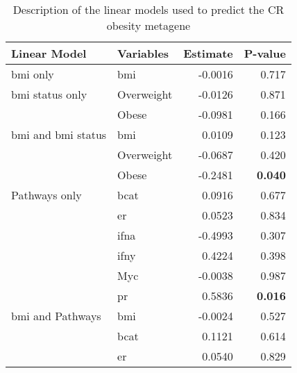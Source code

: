 \begin{table}[htpb]
	\centering
	\caption{Description of the linear models used to predict the CR obesity metagene}
	\label{tab:lm_sig_var}
	\begin{threeparttable}
		\begin{tabular}{llrr}
			Linear Model & Variables & Estimate & P-value\\
			\hline
			\hline
			\rule{0pt}{2.25ex}\gls{bmi} only                           & \gls{bmi}  & -0.0016 & 0.717\\
			\hline
			\rule{0pt}{2.25ex}\gls{bmi} status only                    & Overweight & -0.0126 & 0.871\\
                                                                       & Obese      & -0.0981 & 0.166\\
			\hline
			\rule{0pt}{2.25ex}\gls{bmi} and \gls{bmi} status           & \gls{bmi}  & 0.0109  & 0.123\\
                                                                       & Overweight & -0.0687 & 0.420\\
                                                                       & Obese      & -0.2481 & \textbf{0.040}\tnote{1}\\
			\hline
			\rule{0pt}{2.25ex}Pathways only                            & \gls{bcat} & 0.0916  & 0.677\\
                                                                       & \gls{er}   & 0.0523  & 0.834\\
                                                                       & \gls{ifna} & -0.4993 & 0.307\\
                                                                       & \gls{ifny} & 0.4224  & 0.398\\
                                                                       & Myc        & -0.0038 & 0.987\\
                                                                       & \gls{pr}   & 0.5836  & \textbf{0.016}\\
			\hline
			\rule{0pt}{2.25ex}\gls{bmi} and Pathways                   & \gls{bmi}  & -0.0024 & 0.527\\
                                                                       & \gls{bcat} & 0.1121  & 0.614\\
                                                                       & \gls{er}   & 0.0540  & 0.829\\

\end{tabular}
\end{threeparttable}
\end{table}
